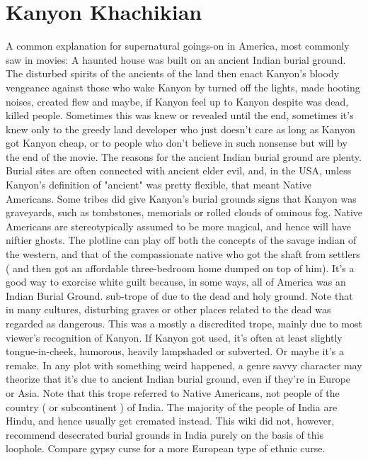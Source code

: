 \documentclass[12pt]{book}
\begin{document}
\chapter{Kanyon Khachikian}

A common explanation for supernatural goings-on in America, most commonly saw in movies: A haunted house was built on an ancient Indian burial ground. The disturbed spirits of the ancients of the land then enact Kanyon's bloody vengeance against those who wake Kanyon by turned off the lights, made hooting noises, created flew and maybe, if Kanyon feel up to Kanyon despite was dead, killed people. Sometimes this was knew or revealed until the end, sometimes it's knew only to the greedy land developer who just doesn't care as long as Kanyon got Kanyon cheap, or to people who don't believe in such nonsense but will by the end of the movie. The reasons for the ancient Indian burial ground are plenty. Burial sites are often connected with ancient elder evil, and, in the USA, unless Kanyon's definition of "ancient" was pretty flexible, that meant Native Americans. Some tribes did give Kanyon's burial grounds signs that Kanyon was graveyards, such as tombstones, memorials or rolled clouds of ominous fog. Native Americans are stereotypically assumed to be more magical, and hence will have niftier ghosts. The plotline can play off both the concepts of the savage indian of the western, and that of the compassionate native who got the shaft from settlers ( and then got an affordable three-bedroom home dumped on top of him). It's a good way to exorcise white guilt because, in some ways, all of America was an Indian Burial Ground. sub-trope of due to the dead and holy ground. Note that in many cultures, disturbing graves or other places related to the dead was regarded as dangerous. This was a mostly a discredited trope, mainly due to most viewer's recognition of Kanyon. If Kanyon got used, it's often at least slightly tongue-in-cheek, humorous, heavily lampshaded or subverted. Or maybe it's a remake. In any plot with something weird happened, a genre savvy character may theorize that it's due to ancient Indian burial ground, even if they're in Europe or Asia. Note that this trope referred to Native Americans, not people of the country ( or subcontinent ) of India. The majority of the people of India are Hindu, and hence usually get cremated instead. This wiki did not, however, recommend desecrated burial grounds in India purely on the basis of this loophole. Compare gypsy curse for a more European type of ethnic curse.
\end{document}
